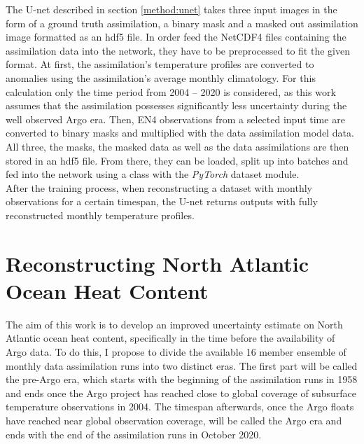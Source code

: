 \documentclass[Masterarbeit.tex]{subfile}
\begin{document}
	The U-net described in section \ref{method:unet} takes three input images in the form of a ground truth assimilation, a binary mask and a masked out assimilation image formatted as an hdf5 file. In order feed the NetCDF4 files containing the assimilation data into the network, they have to be preprocessed to fit the given format. At first, the assimilation's temperature profiles are converted to anomalies using the assimilation's average monthly climatology. For this calculation only the time period from 2004 -- 2020 is considered, as this work assumes that the assimilation possesses significantly less uncertainty during the well observed Argo era. Then, EN4 observations from a selected input time are converted to binary masks and multiplied with the data assimilation model data. All three, the masks, the masked data as well as the data assimilations are then stored in an hdf5 file. From there, they can be loaded, split up into batches and fed into the network using a class with the \textit{PyTorch} dataset module.\\
	After the training process, when reconstructing a dataset with monthly observations for a certain timespan, the U-net returns outputs with fully reconstructed monthly temperature profiles.
	
	
	\section{Reconstructing North Atlantic Ocean Heat Content}
	
	The aim of this work is to develop an improved uncertainty estimate on North Atlantic ocean heat content, specifically in the time before the availability of Argo data. To do this, I propose to divide the available 16 member ensemble of monthly data assimilation runs into two distinct eras. The first part will be called the pre-Argo era, which starts with the beginning of the assimilation runs in 1958 and ends once the Argo project has reached close to global coverage of subsurface temperature observations in 2004. The timespan afterwards, once the Argo floats have reached near global observation coverage, will be called the Argo era and ends with the end of the assimilation runs in October 2020. \\
	
\end{document}
